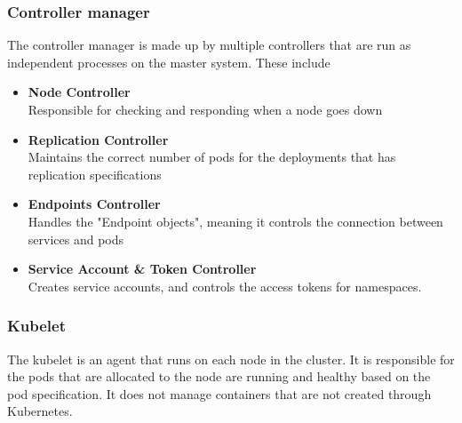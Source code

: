 \documentclass[../main.tex]{subfiles}
\begin{document}
\subsubsection*{Controller manager}
The controller manager is made up by multiple controllers that are run as independent processes on the master system. These include \cite{kubernetes_component_overview}
\begin{itemize}
    \item \textbf{Node Controller}\\
            Responsible for checking and responding when a node goes down
    \item\textbf{Replication Controller}\\
            Maintains the correct number of pods for the deployments that has replication specifications
    \item\textbf{Endpoints Controller}\\
            Handles the "Endpoint objects", meaning it controls the connection between services and pods
    \item\textbf{Service Account \& Token Controller}\\
            Creates service accounts, and controls the access tokens for namespaces.
\end{itemize}

\subsubsection*{Kubelet}
The kubelet is an agent that runs on each node in the cluster. It is responsible for the pods that are allocated to the node are running and healthy based on the pod specification. It does not manage containers that are not created through Kubernetes. \cite{kubernetes_component_overview}
\end{document}
